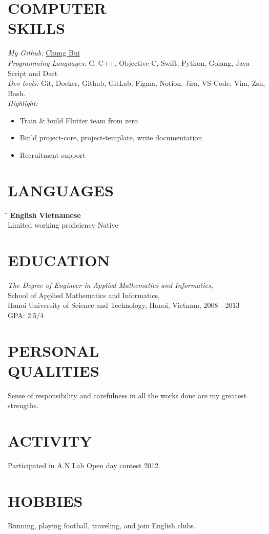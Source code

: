 \documentclass[margin, 10pt]{res}
\begin{document}
\begin{resume}
\section{COMPUTER \\ SKILLS}
	{\sl My Github:} {\color{blue}\href{https://github.com/chungbd}{Chung Bui}}\\
	{\sl Programming Languages:} C, C++, Objective-C, Swift, Python, Golang, Java Script and Dart\\
	{\sl Dev tools:} Git, Docker, Github, GitLab, Figma, Notion, Jira, VS Code, Vim, Zsh, Bash.\\
	{\sl Highlight:}
	\begin{itemize}
		\item Train \& build Flutter team from zero
		\item Build project-core, project-template, write documentation
		\item Recruitment support
	\end{itemize}

\section{LANGUAGES}
	\vspace{-0.1in}
	\begin{tabbing}
    \hspace{2.8in}\= \kill %
    \textbf{English}            \> \textbf{Vietnamese}\\
    Limited working proficiency \> Native\\
	\end{tabbing}\vspace{-20pt}
	
\section{EDUCATION}
   {\sl The Degree of Engineer in Applied Mathematics and Informatics,}\\
   School of Applied Mathematics and Informatics, \\
   Hanoi University of Science and Technology, Hanoi, Vietnam, 2008 - 2013 \\
   GPA: 2.5/4\\
	
\section{PERSONAL \\ QUALITIES} Sense of responsibility and carefulness in all the works done are my greatest strengths.\\
 
\section{ACTIVITY} Participated in A.N Lab Open day contest 2012.

\section{HOBBIES} Running, playing football, traveling, and join English clubs.

\end{resume}
\end{document}
